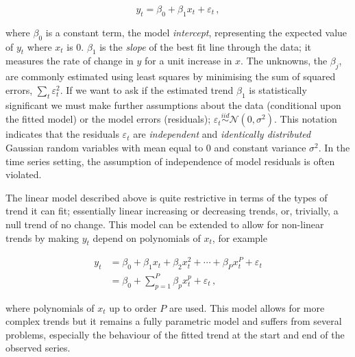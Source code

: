 \documentclass[12pt,]{article}
\begin{document}
\begin{equation} \label{eq:linear-model}
y_t = \beta_0 + \beta_1 x_t + \varepsilon_t \,,
\end{equation}

where \(\beta_0\) is a constant term, the model \emph{intercept},
representing the expected value of \(y_t\) where \(x_t\) is 0.
\(\beta_1\) is the \emph{slope} of the best fit line through the data;
it measures the rate of change in \(y\) for a unit increase in \(x\).
The unknowns, the \(\beta_j\), are commonly estimated using least
squares by minimising the sum of squared errors,
\(\sum_t \varepsilon_t^2\). If we want to ask if the estimated trend
\(\beta_1\) is statistically significant we must make further
assumptions about the data (conditional upon the fitted model) or the
model errors (residuals);
\(\varepsilon_t \stackrel{iid}{\sim} \mathcal{N}(0, \sigma^2)\). This
notation indicates that the residuals \(\varepsilon_t\) are
\emph{independent} and \emph{identically distributed} Gaussian random
variables with mean equal to \(0\) and constant variance \(\sigma^2\).
In the time series setting, the assumption of independence of model
residuals is often violated.

The linear model described above is quite restrictive in terms of the
types of trend it can fit; essentially linear increasing or decreasing
trends, or, trivially, a null trend of no change. This model can be
extended to allow for non-linear trends by making \(y_t\) depend on
polynomials of \(x_t\), for example

\begin{align} \label{eq:polynomial-model}
y_t &= \beta_0 + \beta_1 x_t + \beta_2 x_t^2 + \cdots + \beta_P x_t^P + \varepsilon_t \\
    &= \beta_0 + \sum_{p = 1}^P \beta_p x_t^p  + \varepsilon_t \,, \nonumber
\end{align}

where polynomials of \(x_t\) up to order \(P\) are used. This model
allows for more complex trends but it remains a fully parametric model
and suffers from several problems, especially the behaviour of the
fitted trend at the start and end of the observed series.
\end{document}
